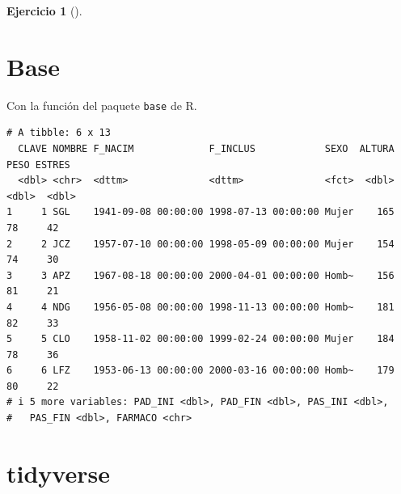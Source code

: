 \documentclass[
  spanish,
  a4paper,
]{scrreport}
\newenvironment{Shaded}{\begin{snugshade}}{\end{snugshade}}
\newcommand{\AttributeTok}[1]{\textcolor[rgb]{0.40,0.45,0.13}{#1}}
\newcommand{\DecValTok}[1]{\textcolor[rgb]{0.68,0.00,0.00}{#1}}
\newcommand{\FunctionTok}[1]{\textcolor[rgb]{0.28,0.35,0.67}{#1}}
\newcommand{\NormalTok}[1]{\textcolor[rgb]{0.00,0.23,0.31}{#1}}
\newcommand{\OtherTok}[1]{\textcolor[rgb]{0.00,0.23,0.31}{#1}}
\newcommand{\SpecialCharTok}[1]{\textcolor[rgb]{0.37,0.37,0.37}{#1}}
\newcommand{\StringTok}[1]{\textcolor[rgb]{0.13,0.47,0.30}{#1}}
\theoremstyle{definition}
\newtheorem{exercise}{Ejercicio}[chapter]
\theoremstyle{remark}
\begin{document}
\begin{exercise}[]
\begin{enumerate}
  \begin{tcolorbox}[enhanced jigsaw, titlerule=0mm, arc=.35mm, rightrule=.15mm, opacitybacktitle=0.6, leftrule=.75mm, colframe=quarto-callout-tip-color-frame, toptitle=1mm, breakable, colbacktitle=quarto-callout-tip-color!10!white, bottomrule=.15mm, colback=white, left=2mm, bottomtitle=1mm, opacityback=0, title=\textcolor{quarto-callout-tip-color}{\faLightbulb}\hspace{0.5em}{Solución}, toprule=.15mm, coltitle=black]

  \section{Base}

  Con la función del paquete \texttt{base} de R.

\begin{Shaded}
\end{Shaded}

\begin{verbatim}
# A tibble: 6 x 13
  CLAVE NOMBRE F_NACIM             F_INCLUS            SEXO  ALTURA  PESO ESTRES
  <dbl> <chr>  <dttm>              <dttm>              <fct>  <dbl> <dbl>  <dbl>
1     1 SGL    1941-09-08 00:00:00 1998-07-13 00:00:00 Mujer    165    78     42
2     2 JCZ    1957-07-10 00:00:00 1998-05-09 00:00:00 Mujer    154    74     30
3     3 APZ    1967-08-18 00:00:00 2000-04-01 00:00:00 Homb~    156    81     21
4     4 NDG    1956-05-08 00:00:00 1998-11-13 00:00:00 Homb~    181    82     33
5     5 CLO    1958-11-02 00:00:00 1999-02-24 00:00:00 Mujer    184    78     36
6     6 LFZ    1953-06-13 00:00:00 2000-03-16 00:00:00 Homb~    179    80     22
# i 5 more variables: PAD_INI <dbl>, PAD_FIN <dbl>, PAS_INI <dbl>,
#   PAS_FIN <dbl>, FARMACO <chr>
\end{verbatim}

  \section{tidyverse}


\end{tcolorbox}
\end{enumerate}
\end{exercise}
\end{document}

